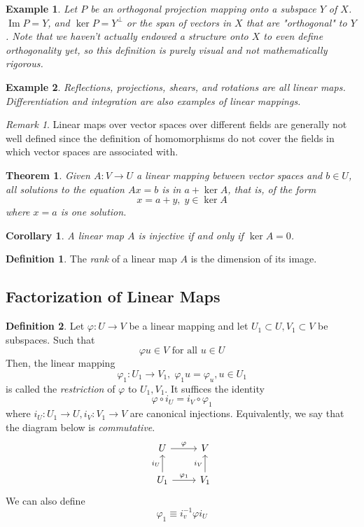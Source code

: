 \documentclass{article}
\DeclareMathOperator{\im}{Im}
\newtheorem{theorem}{Theorem}[section]
\newtheorem{example}{Example}[section]
\newtheorem{corollary}{Corollary}[theorem]
\theoremstyle{remark}
\newtheorem*{remark}{Remark}
\theoremstyle{definition}
\newtheorem{definition}{Definition}[section]
\begin{document}
  \begin{example}
  Let $P$ be an orthogonal projection mapping onto a subspace $Y$ of $X$. $\im P = Y$, and $\ker P = Y^\perp$ or the span of vectors in $X$ that are "orthogonal" to $Y$. Note that we haven't actually endowed a structure onto $X$ to even define orthogonality yet, so this definition is purely visual and not mathematically rigorous. 
  \end{example}

  \begin{example}
  Reflections, projections, shears, and rotations are all linear maps. Differentiation and integration are also examples of linear mappings. 
  \end{example}

  \begin{remark}
  Linear maps over vector spaces over different fields are generally not well defined since the definition of homomorphisms do not cover the fields in which vector spaces are associated with. 
  \end{remark}

  \begin{theorem}
  Given $A: V \longrightarrow U$ a linear mapping between vector spaces and $b \in U$, all solutions to the equation $Ax = b$ is in $a + \ker A$, that is, of the form 
  \[ x = a + y, \; y \in \ker A\]
  where $x = a$ is one solution. 
  \end{theorem}

  \begin{corollary}
  A linear map $A$ is injective if and only if $\ker A = 0$.
  \end{corollary}

  \begin{definition}
  The \textit{rank} of a linear map $A$ is the dimension of its image. 
  \end{definition}

  \subsection{Factorization of Linear Maps}

    \begin{definition}
    Let $\varphi: U \longrightarrow V$ be a linear mapping and let $U_1 \subset U, V_1 \subset V$ be subspaces. Such that \[\varphi u \in V \text{ for all } u \in U\]
    Then, the linear mapping 
    \[\varphi_1: U_1 \longrightarrow V_1, \; \varphi_1 u = \varphi_u, u \in U_1\]
    is called the \textit{restriction} of $\varphi$ to $U_1, V_1$. It suffices the identity
    \[\varphi \circ i_U = i_V \circ \varphi_1\]
    where $i_U: U_1 \longrightarrow U, i_V: V_1 \longrightarrow V$ are canonical injections. Equivalently, we say that the diagram below is \textit{commutative}. 
    \[
      \begin{tikzcd}
        U \arrow{r}{\varphi} & V \\
        U_1 \arrow{u}{i_U} \arrow{r}{\varphi_1} & V_1 \arrow{u}{i_V}
      \end{tikzcd}
    \]
    We can also define 
    \[\varphi_1 \equiv i_v^{-1} \varphi i_U\]
    \end{definition}
\end{document}
